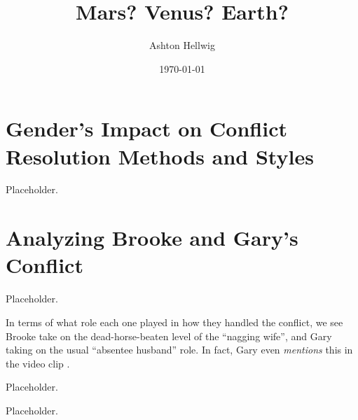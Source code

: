 \documentclass[stu,12pt]{apa7}
\title{%
    Mars? Venus? Earth?
  }
\author{Ashton Hellwig}
\date{\today}
\begin{document}
  \maketitle


  \section{Gender's Impact on Conflict Resolution Methods and Styles}
    Placeholder.

  \section{Analyzing Brooke and Gary's Conflict}
    Placeholder.

    In terms of what role each one played in how they handled the conflict, we
      see Brooke take on the dead-horse-beaten level of the ``nagging wife'',
      and Gary taking on the usual ``absentee husband'' role. In fact, Gary even
      \textit{mentions} this in the video clip \parencite{reed_leaving_2006}.

    Placeholder.

    Placeholder.



  \newpage
  \nocite{*}
  \printbibliography[%
    title={Works Consulted},%
    heading={bibintoc},%
    category={consulted}%
  ]
\end{document}
